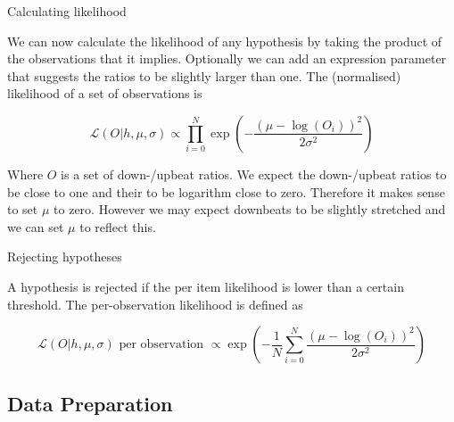Calculating likelihood

We can now calculate the likelihood of any hypothesis by taking the product of the observations that it implies. Optionally we can add an expression parameter that suggests the ratios to be slightly larger than one. The (normalised) likelihood of a set of observations is

\begin{equation}
\label{eq:h_likelihood}
\mathcal{L}(O|h, \mu, \sigma) \propto \prod_{i=0}^N \exp\left(-\frac{(\mu - \log(O_i))^2}{2\sigma^2}\right)
\end{equation}

Where $O$ is a set of down-/upbeat ratios. We expect the down-/upbeat ratios to be close to one and their to be logarithm close to zero. Therefore it makes sense to set $\mu$ to zero. However we may expect downbeats to be slightly stretched and we can set $\mu$ to reflect this.

Rejecting hypotheses

A hypothesis is rejected if the per item likelihood is lower than a certain threshold. The per-observation likelihood is defined as

\begin{equation}
\label{eq:per_obs_likelihood}
\mathcal{L}(O|h, \mu, \sigma) \mbox{ per observation } \propto \exp\left(-\frac{1}{N}\sum_{i=0}^N \frac{(\mu - \log(O_i))^2}{2\sigma^2}\right)
\end{equation}









\subsection{Data Preparation}

